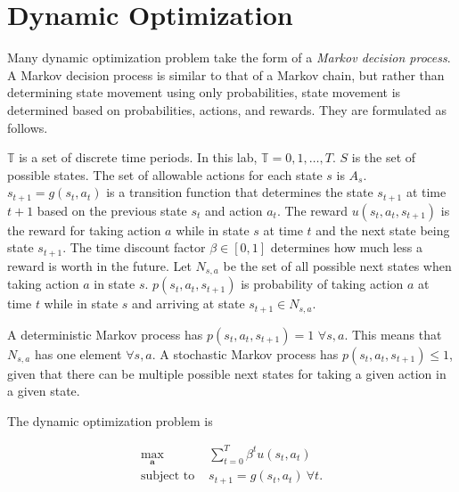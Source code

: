 
\section*{Dynamic Optimization}

Many dynamic optimization problem take the form of a \emph{Markov decision process}.
A Markov decision process is similar to that of a Markov chain, but rather than determining state movement using only probabilities, state movement is determined based on probabilities, actions, and rewards.
They are formulated as follows.

$\mathbb{T}$ is a set of discrete time periods.
In this lab, $\mathbb{T} = {0,1,\ldots, T}$.
$S$ is the set of possible states.
The set of allowable actions for each state $s$ is $A_s$.
$s_{t+1}=g(s_t,a_t)$ is a transition function that determines the state $s_{t+1}$ at time $t+1$ based on the previous state $s_t$ and action $a_t$.
The reward $u(s_t,a_t,s_{t+1})$ is the reward for taking action $a$ while in state $s$ at time $t$ and the next state being state $s_{t+1}$.
The time discount factor $\beta \in [0,1]$ determines how much less a reward is worth in the future.
Let $N_{s,a}$ be the set of all possible next states when taking action $a$ in state $s$.
$p(s_t,a_t,s_{t+1})$ is probability of taking action $a$ at time $t$ while in state $s$ and arriving at state $s_{t+1}\in N_{s,a}$.

A deterministic Markov process has $p(s_t,a_t,s_{t+1}) = 1$ $\forall s,a$.
This means that $N_{s,a}$ has one element $\forall s,a$.
A stochastic Markov process has $p(s_t,a_t,s_{t+1})\leq 1$, given that there can be multiple possible next states for taking a given action in a given state.

The dynamic optimization problem is

\begin{align}
\label{eq:policyiter-dynopt1}
\max_\mathbf{a}  & \sum_{t=0}^T \beta^t u(s_t,a_t) \\
\mbox{subject to } & s_{t+1}= g(s_t,a_t)\ \forall t.
\end{align}


